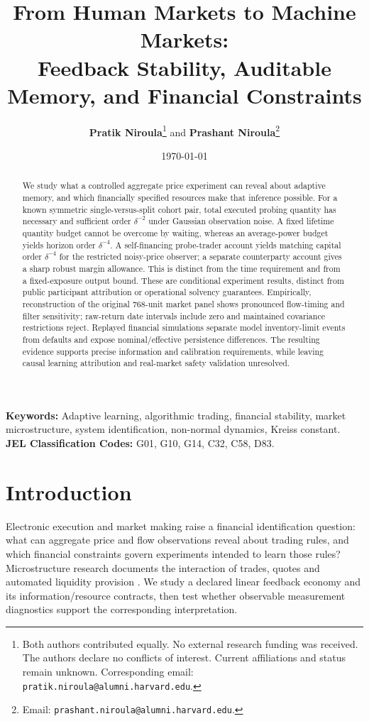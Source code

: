 \documentclass[12pt]{article}
\title{\textbf{From Human Markets to Machine Markets:}\\[0.3em]
\Large Feedback Stability, Auditable Memory, and Financial Constraints}
\author{\textbf{Pratik Niroula}\thanks{Both authors contributed equally. No external research funding was received. The authors declare no conflicts of interest. Current affiliations and status remain unknown. Corresponding email: \texttt{pratik.niroula@alumni.harvard.edu}.} \quad and \quad \textbf{Prashant Niroula}\thanks{Email: \texttt{prashant.niroula@alumni.harvard.edu}.}}
\date{\today}
\theoremstyle{definition}
\theoremstyle{remark}
\begin{document}
\maketitle
\thispagestyle{empty}

\vspace{-0.5em}
\begin{abstract}
\noindent We study what a controlled aggregate price experiment can reveal about adaptive memory, and which financially specified resources make that inference possible. For a known symmetric single-versus-split cohort pair, total executed probing quantity has necessary and sufficient order $\delta^{-2}$ under Gaussian observation noise. A fixed lifetime quantity budget cannot be overcome by waiting, whereas an average-power budget yields horizon order $\delta^{-4}$. A self-financing probe-trader account yields matching capital order $\delta^{-4}$ for the restricted noisy-price observer; a separate counterparty account gives a sharp robust margin allowance. This is distinct from the time requirement and from a fixed-exposure output bound. These are conditional experiment results, distinct from public participant attribution or operational solvency guarantees. Empirically, reconstruction of the original 768-unit market panel shows pronounced flow-timing and filter sensitivity; raw-return date intervals include zero and maintained covariance restrictions reject. Replayed financial simulations separate model inventory-limit events from defaults and expose nominal/effective persistence differences. The resulting evidence supports precise information and calibration requirements, while leaving causal learning attribution and real-market safety validation unresolved.


\end{abstract}

\vspace{1.0em}
\noindent\textbf{Keywords:} Adaptive learning, algorithmic trading, financial stability, market microstructure, system identification, non-normal dynamics, Kreiss constant.\\
\textbf{JEL Classification Codes:} G01, G10, G14, C32, C58, D83.

\newpage
\setcounter{page}{1}

\section{Introduction}
\label{sec:intro}

Electronic execution and market making raise a financial identification question: what can aggregate price and flow observations reveal about trading rules, and which financial constraints govern experiments intended to learn those rules? Microstructure research documents the interaction of trades, quotes and automated liquidity provision \citep{hasbrouck1991,menkveld2013,budish2015}. We study a declared linear feedback economy and its information/resource contracts, then test whether observable measurement diagnostics support the corresponding interpretation.
\end{document}
